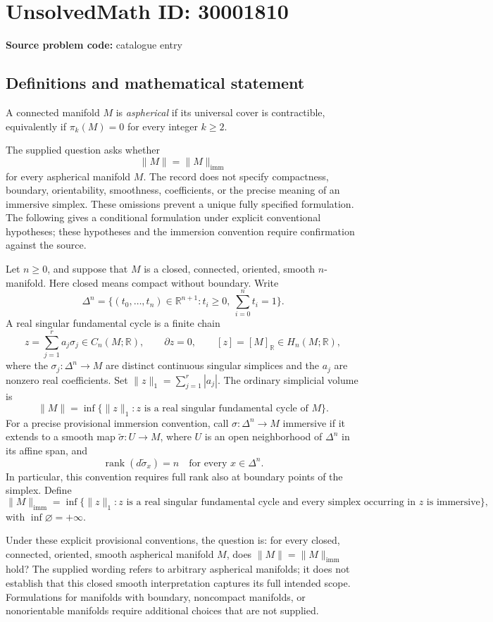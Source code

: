\documentclass[11pt]{article}
\newcommand{\R}{\mathbb{R}}
\begin{document}
\section*{UnsolvedMath ID: 30001810}
\textbf{Source problem code:} catalogue entry
\subsection{Definitions and mathematical statement}
A connected manifold \(M\) is \emph{aspherical} if its universal cover is contractible, equivalently if \(\pi_k(M)=0\) for every integer \(k\geq 2\).

The supplied question asks whether
\[
\lVert M\rVert=\lVert M\rVert_{\mathrm{imm}}
\]
for every aspherical manifold \(M\). The record does not specify compactness, boundary, orientability, smoothness, coefficients, or the precise meaning of an immersive simplex. These omissions prevent a unique fully specified formulation. The following gives a conditional formulation under explicit conventional hypotheses; these hypotheses and the immersion convention require confirmation against the source.

Let \(n\geq 0\), and suppose that \(M\) is a closed, connected, oriented, smooth \(n\)-manifold. Here closed means compact without boundary. Write
\[
\Delta^n=\bigl\{(t_0,\ldots,t_n)\in\R^{n+1}:t_i\geq 0,\ \textstyle\sum_{i=0}^n t_i=1\bigr\}.
\]
A real singular fundamental cycle is a finite chain
\[
z=\sum_{j=1}^r a_j\sigma_j\in C_n(M;\R),\qquad
\partial z=0,\qquad [z]=[M]_{\R}\in H_n(M;\R),
\]
where the \(\sigma_j:\Delta^n\to M\) are distinct continuous singular simplices and the \(a_j\) are nonzero real coefficients. Set \(\lVert z\rVert_1=\sum_{j=1}^r|a_j|\). The ordinary simplicial volume is
\[
\lVert M\rVert
=\inf\bigl\{\lVert z\rVert_1:z\text{ is a real singular fundamental cycle of }M\bigr\}.
\]
For a precise provisional immersion convention, call \(\sigma:\Delta^n\to M\) immersive if it extends to a smooth map \(\widetilde\sigma:U\to M\), where \(U\) is an open neighborhood of \(\Delta^n\) in its affine span, and
\[
\operatorname{rank}(d\widetilde\sigma_x)=n
\quad\text{for every }x\in\Delta^n.
\]
In particular, this convention requires full rank also at boundary points of the simplex. Define
\[
\lVert M\rVert_{\mathrm{imm}}
=\inf\bigl\{\lVert z\rVert_1:z\text{ is a real singular fundamental cycle and every simplex occurring in }z\text{ is immersive}\bigr\},
\]
with \(\inf\varnothing=+\infty\).

Under these explicit provisional conventions, the question is: for every closed, connected, oriented, smooth aspherical manifold \(M\), does \(\lVert M\rVert=\lVert M\rVert_{\mathrm{imm}}\) hold? The supplied wording refers to arbitrary aspherical manifolds; it does not establish that this closed smooth interpretation captures its full intended scope. Formulations for manifolds with boundary, noncompact manifolds, or nonorientable manifolds require additional choices that are not supplied.
\end{document}

